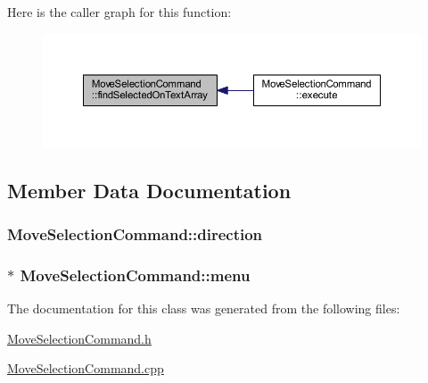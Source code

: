 Here is the caller graph for this function\+:\nopagebreak
\begin{figure}[H]
\begin{center}
\leavevmode
\includegraphics[width=350pt]{class_move_selection_command_a6a9d0bed09292f4465c3a09a847ed0be_icgraph}
\end{center}
\end{figure}




\subsection{Member Data Documentation}
\hypertarget{class_move_selection_command_a27a2a41486ddb096f3a1f350395ea0ea}{}
\subsubsection[{direction}]{ Move\+Selection\+Command\+::direction\hspace{0.3cm}{\ttfamily [private]}}\label{class_move_selection_command_a27a2a41486ddb096f3a1f350395ea0ea}
\hypertarget{class_move_selection_command_a1d6727564354bf48e4d77f1f9b27680d}{}
\subsubsection[{menu}]{$\ast$ Move\+Selection\+Command\+::menu\hspace{0.3cm}{\ttfamily [private]}}\label{class_move_selection_command_a1d6727564354bf48e4d77f1f9b27680d}


The documentation for this class was generated from the following files\+:\begin{DoxyCompactItemize}
\item 
\hyperlink{_move_selection_command_8h}{Move\+Selection\+Command.\+h}\item 
\hyperlink{_move_selection_command_8cpp}{Move\+Selection\+Command.\+cpp}\end{DoxyCompactItemize}
